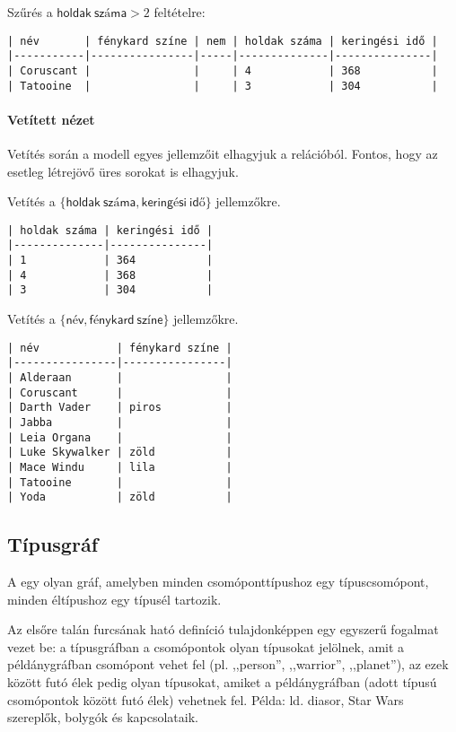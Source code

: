 Szűrés a $\mathsf{holdak\: száma} > 2$ feltételre:

\begin{verbatim}
| név       | fénykard színe | nem | holdak száma | keringési idő |
|-----------|----------------|-----|--------------|---------------|
| Coruscant |                |     | 4            | 368           |
| Tatooine  |                |     | 3            | 304           |
\end{verbatim}

\paragraph{Vetített nézet}

Vetítés során a modell egyes jellemzőit elhagyjuk a relációból. Fontos, hogy az esetleg létrejövő üres sorokat is elhagyjuk.

Vetítés a $\{\mathsf{holdak\: száma, keringési\: idő\}}$ jellemzőkre.

\begin{verbatim}
| holdak száma | keringési idő |
|--------------|---------------|
| 1            | 364           |
| 4            | 368           |
| 3            | 304           |
\end{verbatim}

Vetítés a $\{\mathsf{név, fénykard\: színe\}}$ jellemzőkre.

\begin{verbatim}
| név            | fénykard színe |
|----------------|----------------|
| Alderaan       |                |
| Coruscant      |                |
| Darth Vader    | piros          |
| Jabba          |                |
| Leia Organa    |                |
| Luke Skywalker | zöld           |
| Mace Windu     | lila           |
| Tatooine       |                |
| Yoda           | zöld           |
\end{verbatim}

\subsection{Típusgráf}

\begin{definicio}
A  egy olyan gráf, amelyben minden csomóponttípushoz egy típuscsomópont, minden éltípushoz egy típusél tartozik.
\end{definicio}

Az elsőre talán furcsának ható definíció tulajdonképpen egy egyszerű fogalmat vezet be: a típusgráfban a csomópontok olyan típusokat jelölnek, amit a példánygráfban csomópont vehet fel (pl. ,,person'', ,,warrior'', ,,planet''), az ezek között futó élek pedig olyan típusokat, amiket a példánygráfban (adott típusú csomópontok között futó élek) vehetnek fel. Példa: ld. diasor, Star Wars szereplők, bolygók és kapcsolataik.

